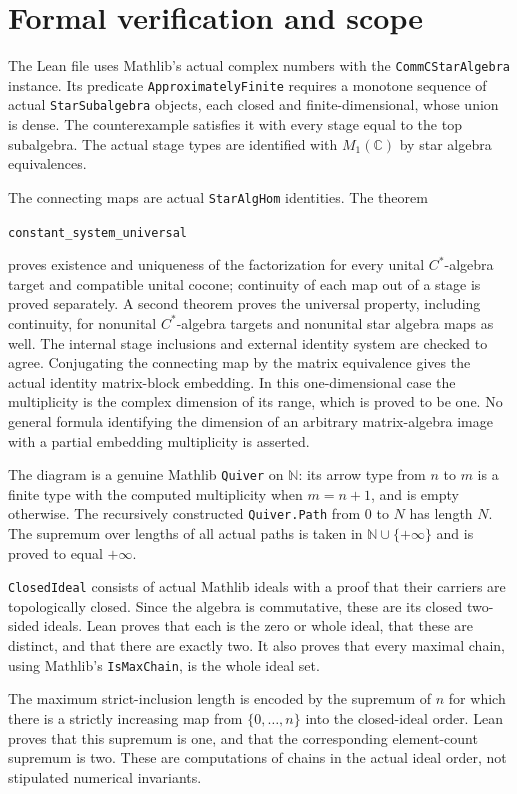 \documentclass[11pt]{article}
\begin{document}
\section*{Formal verification and scope}
The Lean file uses Mathlib's actual complex numbers with the
\texttt{CommCStarAlgebra} instance. Its predicate
\texttt{ApproximatelyFinite} requires a monotone sequence of actual
\texttt{StarSubalgebra} objects, each closed and finite-dimensional,
whose union is dense. The counterexample satisfies it with every
stage equal to the top subalgebra. The actual stage types are
identified with $M_1(\mathbb C)$ by star algebra equivalences.

The connecting maps are actual \texttt{StarAlgHom} identities.
The theorem
\begin{center}\small\texttt{constant\_system\_universal}\end{center}
proves existence and uniqueness of the factorization for every
unital $C^*$-algebra target and compatible unital cocone; continuity
of each map out of a stage is proved separately. A second theorem
proves the universal property, including continuity, for nonunital
$C^*$-algebra targets and nonunital star algebra maps as well.
The internal stage
inclusions and external identity system are checked to agree.
Conjugating the connecting map by the matrix equivalence gives the
actual identity matrix-block embedding. In this one-dimensional
case the multiplicity is the complex dimension of its range,
which is proved to be one. No general formula identifying the
dimension of an arbitrary matrix-algebra image with a partial
embedding multiplicity is asserted.

The diagram is a genuine Mathlib \texttt{Quiver} on $\mathbb N$:
its arrow type from $n$ to $m$ is a finite type with the computed
multiplicity when $m=n+1$, and is empty otherwise. The recursively
constructed \texttt{Quiver.Path} from $0$ to $N$ has length $N$.
The supremum over lengths of all actual paths is taken in
$\mathbb N\cup\{+\infty\}$ and is proved to equal $+\infty$.

\texttt{ClosedIdeal} consists of actual Mathlib ideals with a proof
that their carriers are topologically closed. Since the algebra is
commutative, these are its closed two-sided ideals. Lean proves
that each is the zero or whole ideal, that these are distinct, and
that there are exactly two. It also proves that every maximal chain,
using Mathlib's \texttt{IsMaxChain}, is the whole ideal set.

The maximum strict-inclusion length is encoded by the supremum of
$n$ for which there is a strictly increasing map from
$\{0,\ldots,n\}$ into the closed-ideal order. Lean proves that this
supremum is one, and that the corresponding element-count supremum
is two. These are computations of chains in the actual ideal
order, not stipulated numerical invariants.
\end{document}
